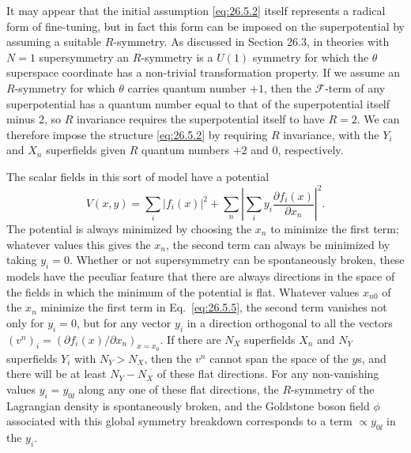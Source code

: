 It may appear that the initial assumption \eqref{eq:26.5.2} itself represents
a radical form of fine-tuning, but in fact this form can be imposed on the
superpotential by assuming a suitable $R$-symmetry. As discussed in Section
26.3, in theories with $N=1$ supersymmetry an $R$-symmetry is a $U(1)$
symmetry for which the $\theta$ superspace coordinate has a non-trivial
transformation property. If we assume an $R$-symmetry for which \(\theta\)
carries quantum number $+1$, then the $\mathcal{F}$-term of any
superpotential has a
quantum number equal to that of the superpotential itself minus 2, so $R$
invariance requires the superpotential itself to have $R=2$. We can
therefore impose the structure \eqref{eq:26.5.2} by requiring $R$ invariance,
with the $Y_i$ and $X_n$ superfields given $R$ quantum numbers $+2$ and 0,
respectively.

The scalar fields in this sort of model have a potential
\begin{equation}
  V(x,y)
  =\sum_i\lvert f_i(x)\rvert^2
   +\sum_n\left\lvert
     \sum_i y_i\frac{\partial f_i(x)}{\partial x_n}
   \right\rvert^2 .
  \tag{26.5.5}\label{eq:26.5.5}
\end{equation}
The potential is always minimized by choosing the $x_n$ to minimize the first
term; whatever values this gives the $x_n$, the second term can always be
minimized by taking $y_i=0$. Whether or not supersymmetry can be
spontaneously broken, these models have the peculiar feature that there are
always directions in the space of the fields in which the minimum of the
potential is flat. Whatever values $x_{n0}$ of the $x_n$ minimize the first
term in Eq.~\eqref{eq:26.5.5}, the second term vanishes not only for $y_i=0$,
but for any vector $y_i$ in a direction orthogonal to all the vectors
$(v^n)_i=(\partial f_i(x)/\partial x_n)_{x=x_0}$. If there are $N_X$
superfields $X_n$ and $N_Y$ superfields $Y_i$ with $N_Y>N_X$, then the $v^n$
cannot span the space of the $y$s, and there will be at least $N_Y-N_X$ of
these flat directions. For any non-vanishing values $y_i=y_{0\ii}$ along any
one of these flat directions, the $R$-symmetry of the Lagrangian density is
spontaneously broken, and the Goldstone boson field $\phi$ associated with
this global symmetry breakdown corresponds to a term $\propto y_{0\ii}$ in the
$y_i$.

